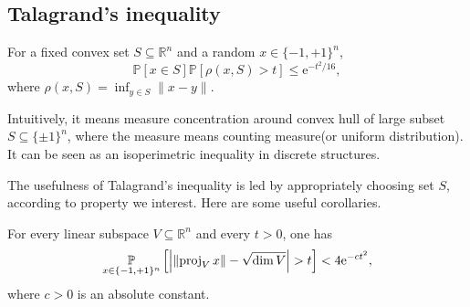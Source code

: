 \documentclass[10pt]{book}
\begin{document}
\subsection{Talagrand's inequality}
\begin{thm}
\label{tal_ineq}
For a fixed convex set $S \subseteq \mathbb{R}^n$ and a random $x \in\{-1,+1\}^n$,
$$
\mathbb{P}[x \in S] \mathbb{P}[\rho(x, S)>t] \leq \mathrm{e}^{-t^2 / 16},
$$
where $\rho(x, S)=\inf _{y \in S}\|x-y\|$.
\end{thm}
Intuitively, it means measure concentration around convex hull of large subset $S\subseteq\{\pm 1\}^n$, where the measure means counting measure(or uniform distribution). It can be seen as an isoperimetric inequality in discrete structures.

The usefulness of Talagrand's inequality is led by appropriately choosing set $S$, according to property we interest. Here are some useful corollaries.
\begin{cor}
\label{tal_ineq_proj}
For every linear subspace $V \subseteq \mathbb{R}^n$ and every $t>0$, one has
$$
\underset{x \in\{-1,+1\}^n}{\mb{P}}\left[\left|\left\|\operatorname{proj}_V x\right\|-\sqrt{\operatorname{dim} V}\right|>t\right]<4 \mathrm{e}^{-c t^2},
$$
where $c>0$ is an absolute constant.
\end{cor}

\end{document}
